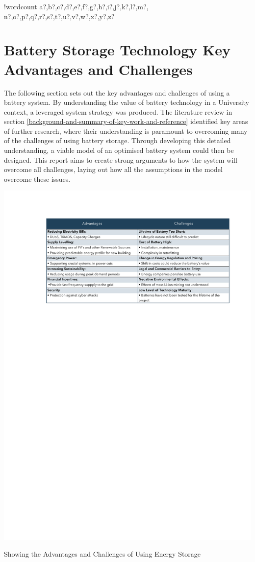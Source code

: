 \documentclass[fontsize=9.5pt]{extarticle}
\numberwithin{figure}{section} %
\newcounter{words}
\newenvironment{counted}{%
  \setcounter{words}{0}
  \SearchList!{wordcount}{\stepcounter{words}}
    {a?,b?,c?,d?,e?,f?,g?,h?,i?,j?,k?,l?,m?,
    n?,o?,p?,q?,r?,s?,t?,u?,v?,w?,x?,y?,z?}
  \UndoBoundary{'}
  \SearchOrder{p;}}{%
  \StopSearching}
\begin{document}
\begin{counted}
\section{Battery Storage Technology Key Advantages and
Challenges}\label{battery-storage-technology-key-advantages-and-challenges}

The following section sets out the key advantages and challenges of
using a battery system. By understanding the value of battery technology
in a University context, a leveraged system strategy was produced. The
literature review in section
\ref{background-and-summary-of-key-work-and-reference} identified key
areas of further research, where their understanding is paramount to
overcoming many of the challenges of using battery storage. Through
developing this detailed understanding, a viable model of an optimised
battery system could then be designed. This report aims to create strong
arguments to how the system will overcome all challenges, laying out how
all the assumptions in the model overcome these issues.

\begin{table}[H]
\centering
\includegraphics[trim = 0 0 0 0, clip, width=1\textwidth]{AdChallTab2.pdf}
\caption{Showing the Advantages and Challenges of Using Energy Storage}
\label{AdChalltab}
\end{table}


\end{counted}
\end{document}
